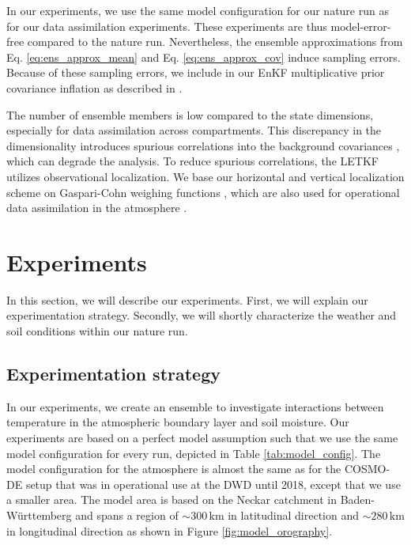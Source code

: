 \documentclass[HESSD, manuscript]{copernicus}
\begin{document}
In our experiments, we use the same model configuration for our nature run as for our data assimilation experiments.
These experiments are thus model-error-free compared to the nature run.
Nevertheless, the ensemble approximations from Eq. \eqref{eq:ens_approx_mean} and Eq. \eqref{eq:ens_approx_cov} induce sampling errors.
Because of these sampling errors, we include in our EnKF multiplicative prior covariance inflation as described in \citet{hunt_efficient_2007}.

The number of ensemble members is low compared to the state dimensions, especially for data assimilation across compartments.
This discrepancy in the dimensionality introduces spurious correlations into the background covariances \citep{miyoshi_10240-member_2014}, which can degrade the analysis.
To reduce spurious correlations, the LETKF utilizes observational localization.
We base our horizontal and vertical localization scheme on Gaspari-Cohn weighing functions \citep{gaspari_construction_1999}, which are also used for operational data assimilation in the atmosphere \citep{schraff_kilometre-scale_2016}.


\section{Experiments}

In this section, we will describe our experiments.
First, we will explain our experimentation strategy.
Secondly, we will shortly characterize the weather and soil conditions within our nature run.

\subsection{Experimentation strategy}

In our experiments, we create an ensemble to investigate interactions between temperature in the atmospheric boundary layer and soil moisture.
Our experiments are based on a perfect model assumption such that we use the same model configuration for every run, depicted in Table \ref{tab:model_config}.
The model configuration for the atmosphere is almost the same as for the COSMO-DE setup that was in operational use at the DWD until 2018, except that we use a smaller area.
The model area is based on the Neckar catchment in Baden-Württemberg and spans a region of $\sim 300\,\text{km}$ in latitudinal direction and $\sim 280\,\text{km}$ in longitudinal direction as shown in Figure \ref{fig:model_orography}.
\end{document}
